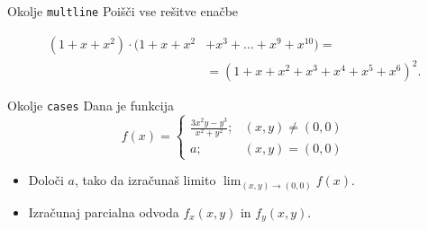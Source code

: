 \begin{frame}{Okolje \texttt{multline}}
	Poišči vse rešitve enačbe
	
	\begin{align*}
		(1+x+x^2) \cdot (1+x+x^2&+x^3+\ldots+x^9+x^{10}) = \\
		&=(1+x+x^2+x^3+x^4+x^5+x^6)^2.
	\end{align*}
\end{frame}

\begin{frame}{Okolje \texttt{cases}}
	Dana je funkcija
	\[f(x) =
	\begin{cases}
		\frac{3x^2y-y^3}{x^2+y^2}; & (x, y) \neq (0, 0) \\
		a; & (x, y) = (0, 0)
	\end{cases}
	\]
	\begin{itemize}
	\item Določi $a$, tako da izračunaš limito \( \lim_{(x,y)\to(0,0)} f(x). \)
	\item Izračunaj parcialna odvoda $f_x(x,y)$ in $f_y(x,y)$.
	\end{itemize}
\end{frame}
